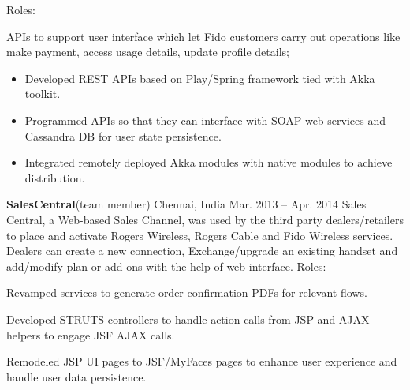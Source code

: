 \begin{cventries}
{}
    {Roles:}
    {
      \begin{cvitems}
        \item {APIs to support user interface which let Fido customers carry out operations like make payment, access usage details, update profile details;}
\begin{itemize}
\item Developed REST APIs based on Play/Spring framework tied with Akka toolkit.
\end{itemize}
\begin{itemize}
\item Programmed APIs so that they can interface with SOAP web services and Cassandra DB for user state persistence.
\end{itemize}
\begin{itemize}
\item Integrated remotely deployed Akka modules with native modules to achieve distribution. 
\end{itemize}
      \end{cvitems} 
    }

    \experienceentry
    {\textbf{SalesCentral}(team member)}
    {}
    {Chennai, India}
    {Mar. 2013 – Apr. 2014}
    {Sales Central, a Web-based Sales Channel, was used by the third party dealers/retailers to place and activate Rogers Wireless, Rogers Cable and Fido Wireless services. Dealers can create a new connection, Exchange/upgrade an existing handset and add/modify plan or add-ons with the help of web interface. }
    {Roles:}
    {\begin{cvitems}
        \item {Revamped services to generate order confirmation PDFs for relevant flows. }
        \item {Developed STRUTS controllers to handle action calls from JSP and AJAX helpers to engage JSF AJAX calls.}
        \item {Remodeled JSP UI pages to JSF/MyFaces pages to enhance user experience and handle user data persistence.}
      \end{cvitems}
    }
\end{cventries}
